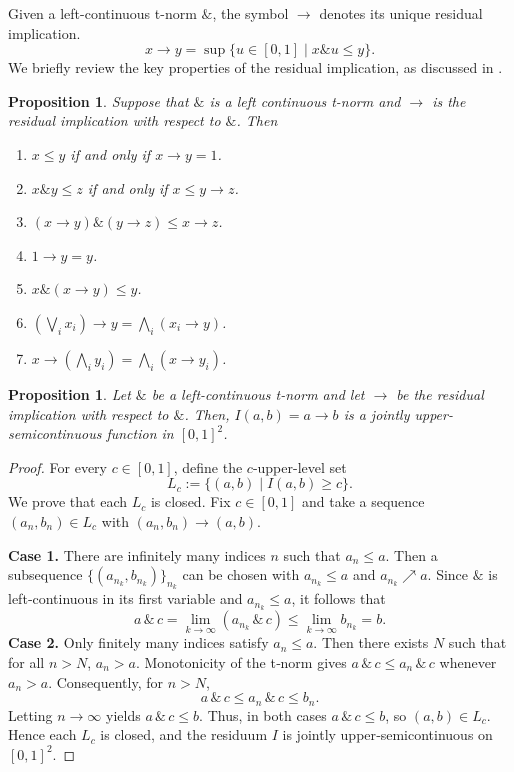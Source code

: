\documentclass[preprint,3p,times]{elsarticle}
\theoremstyle{plain}
\newtheorem{prop}[thm]{Proposition}
\theoremstyle{definition}
\numberwithin{equation}{section}
\begin{document}
Given a left-continuous t-norm \(\& \), the symbol \( \rightarrow \) denotes its unique residual implication. 
\[
x\rightarrow y = \sup\{u \in [0,1] \mid x\& u \leq y\}.
\]
We briefly review the key properties of the residual implication, as discussed in \cite{HL2006}.
\begin{prop}\label{properties of residual implication}
    Suppose that \( \& \) is a left continuous t-norm and \( \rightarrow \) is the residual implication with respect to \( \& \). Then
\begin{enumerate}[label={\rm(\arabic*)}]
    \item \( x \leq y \) if and only if \( x\rightarrow y = 1 \).
    \item \( x\& y \leq z \) if and only if \( x \leq y\rightarrow z \).
    \item \( (x\rightarrow y)\& (y\rightarrow z) \leq x\rightarrow z \).
    \item \( 1\rightarrow y = y \).
    \item \( x\&( x \rightarrow y) \leq y \).
    \item \(( \bigvee_{i} x_i)\rightarrow y=\bigwedge_i(x_i\rightarrow y)\).
    \item \( x\rightarrow(\bigwedge_i y_i) =\bigwedge_i (x\rightarrow y_i)\).
\end{enumerate}
\end{prop}
\begin{prop}\label{left-continuous is jointly upper semicontinuous function}
	Let \(\&\) be a left-continuous t-norm and let \(\rightarrow\) be the residual implication with respect to \(\&\). Then, \(I(a, b) = a\rightarrow b \) is a jointly upper-semicontinuous
function in \([0,1]^2\).
\end{prop}
\begin{proof}
For every \(c\in[0,1]\), define the \(c\)-upper-level set
\[
L_c:=\{(a,b)\mid I(a,b)\ge c\}.
\]
We prove that each \(L_c\) is closed. Fix \(c\in[0,1]\) and take a sequence \((a_n,b_n)\in L_c\) with \((a_n,b_n)\to(a,b)\).  
 
\noindent\textbf{Case 1.} There are infinitely many indices \(n\) such that \(a_n\le a\).  
Then a subsequence \(\{(a_{n_k},b_{n_k})\}_{n_k}\) can be chosen  with \(a_{n_k}\le a\) and \(a_{n_k}\nearrow a\).  
Since \(\&\) is left‑continuous in its first variable and \(a_{n_k}\le a\), it follows that
\[
 a\,\&\,c=\lim_{k\to\infty} (a_{n_k}\,\&\,c) \le \lim_{k\to\infty} b_{n_k}=b .
\]
\noindent\textbf{Case 2.} Only finitely many indices satisfy \(a_n\le a\).  
Then there exists \(N\) such that for all \(n>N\), \(a_n > a\).  
Monotonicity of the t‑norm gives \(a\,\&\,c \le a_n\,\&\,c\) whenever \(a_n>a\). Consequently, for \(n>N\),
\[
a\,\&\,c \le a_n\,\&\,c \le b_n .
\]
Letting \(n\to\infty\) yields  \(a\,\&\,c \le b\).
Thus, in both cases \(a\,\&\,c\le b\), so \((a,b)\in L_c\). Hence each \(L_c\) is closed, and the residuum \(I\) is jointly upper‑semicontinuous on \([0,1]^2\).  
\end{proof}
\end{document}
